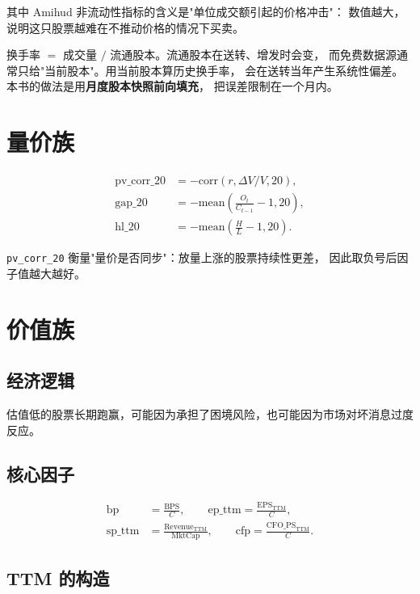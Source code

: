 其中 Amihud 非流动性指标的含义是"单位成交额引起的价格冲击"：
数值越大，说明这只股票越难在不推动价格的情况下买卖。

\begin{warnbox}[换手率的口径问题]
换手率 $=$ 成交量 $/$ 流通股本。流通股本在送转、增发时会变，
而免费数据源通常只给"当前股本"。用当前股本算历史换手率，
会在送转当年产生系统性偏差。本书的做法是用\textbf{月度股本快照前向填充}，
把误差限制在一个月内。
\end{warnbox}

\section{量价族}

\begin{align}
  \text{pv\_corr\_20} &= -\mathrm{corr}(r, \Delta V/V, 20), \\
  \text{gap\_20} &= -\mathrm{mean}\!\left(\frac{O_t}{C_{t-1}} - 1, 20\right), \\
  \text{hl\_20} &= -\mathrm{mean}\!\left(\frac{H}{L} - 1, 20\right).
\end{align}

\texttt{pv\_corr\_20} 衡量"量价是否同步"：放量上涨的股票持续性更差，
因此取负号后因子值越大越好。

\section{价值族}

\subsection{经济逻辑}

估值低的股票长期跑赢，可能因为承担了困境风险，也可能因为市场对坏消息过度反应。

\subsection{核心因子}

\begin{align}
  \text{bp} &= \frac{\text{BPS}}{C}, \qquad
  \text{ep\_ttm} = \frac{\text{EPS}_{\text{TTM}}}{C}, \\
  \text{sp\_ttm} &= \frac{\text{Revenue}_{\text{TTM}}}{\text{MktCap}}, \qquad
  \text{cfp} = \frac{\text{CFO\_PS}_{\text{TTM}}}{C}.
\end{align}

\subsection{TTM 的构造}

